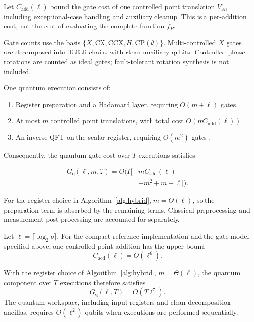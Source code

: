 \begin{revision}
Let $C_{\mathrm{add}}(\ell)$ bound the gate cost of one controlled point translation $V_A$, including exceptional-case handling and auxiliary cleanup. This is a per-addition cost, not the cost of evaluating the complete function $f_P$.

Gate counts use the basis $\{X,\mathrm{CX},\mathrm{CCX},H, \mathrm{CP}(\theta)\}$. Multi-controlled $X$ gates are decomposed into Toffoli chains with clean auxiliary qubits. Controlled phase rotations are counted as ideal gates; fault-tolerant rotation synthesis is not included.

One quantum execution consists of:
\begin{enumerate}
    \item Register preparation and a Hadamard layer, requiring $O(m+\ell)$ gates.
    \item At most $m$ controlled point translations, with total cost $O(mC_{\mathrm{add}}(\ell))$.
    \item An inverse QFT on the scalar register, requiring $O(m^2)$ gates \cite{NielsenChuang2010}.
\end{enumerate}

Consequently, the quantum gate cost over $T$ executions satisfies

\begin{equation}
    \label{eq:quantum_cost_parametric}
    \begin{aligned}
        G_{\mathrm q}(\ell,m,T)
        =O\bigl(T[&
        mC_{\mathrm{add}}(\ell)\\
        &+m^2+m+\ell]\bigr).
    \end{aligned}
\end{equation}

For the register choice in Algorithm~\ref{alg:hybrid}, $m=\Theta(\ell)$, so the preparation term is absorbed by the remaining terms. Classical preprocessing and measurement post-processing are accounted for separately.

\begin{theorem}
\label{thm:resource_bound}
Let $\ell=\lceil\log_2 p\rceil$. For the compact reference implementation and the gate model specified above, one controlled point addition has the upper bound 
\[
C_{\mathrm{add}}(\ell)=O(\ell^6).
\]

With the register choice of Algorithm~\ref{alg:hybrid}, $m=\Theta(\ell)$, the quantum component over $T$ executions therefore satisfies
\[
G_{\mathrm q}(\ell,T)=O(T\ell^7).
\]
The quantum workspace, including input registers and clean decomposition ancillas, requires $O(\ell^2)$ qubits when executions are performed sequentially.
\end{theorem}


\end{revision}
